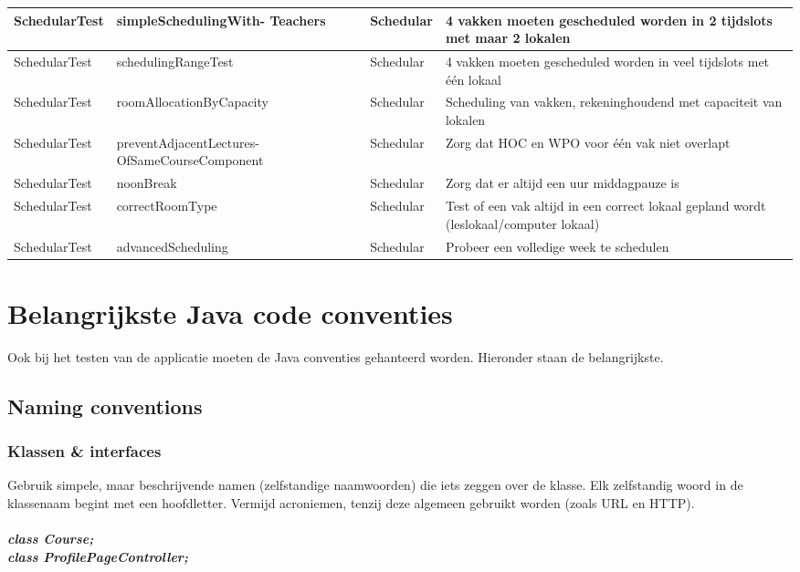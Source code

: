 \begin{table}[htbp]
\begin{tabularx}{\textwidth}{|X|X|X|X|}
		SchedularTest & simpleSchedulingWith- Teachers & Schedular & 4 vakken moeten gescheduled worden in 2 tijdslots met maar 2 lokalen \\ \hline
		SchedularTest & schedulingRangeTest & Schedular & 4 vakken moeten gescheduled worden in veel tijdslots met één lokaal \\ \hline
		SchedularTest & roomAllocationByCapacity & Schedular & Scheduling van vakken, rekeninghoudend met capaciteit van lokalen \\ \hline
		SchedularTest & preventAdjacentLectures- OfSameCourseComponent & Schedular & Zorg dat HOC en WPO voor één vak niet overlapt \\ \hline
		SchedularTest & noonBreak & Schedular & Zorg dat er altijd een uur middagpauze is \\ \hline
		SchedularTest & correctRoomType & Schedular & Test of een vak altijd in een correct lokaal gepland wordt (leslokaal/computer lokaal) \\ \hline
		SchedularTest & advancedScheduling & Schedular & Probeer een volledige week te schedulen \\ \hline
		
	\end{tabularx}
\end{table}

\section{Belangrijkste Java code conventies}
Ook bij het testen van de applicatie moeten de Java conventies gehanteerd worden. 
Hieronder staan de belangrijkste.
\subsection{Naming conventions}
	\subsubsection{Klassen \& interfaces}
		Gebruik simpele, maar beschrijvende namen (zelfstandige naamwoorden) die iets zeggen over de klasse. Elk zelfstandig woord in de klassenaam begint met een hoofdletter. Vermijd acroniemen, tenzij deze algemeen gebruikt worden (zoals URL en HTTP).
		\\ \\
		\emph{\textbf{class Course;}} \\
		\emph{\textbf{class ProfilePageController;}}
		
